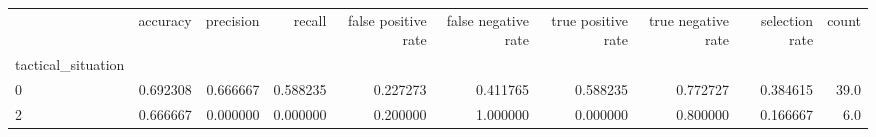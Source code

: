 \begin{tabular}{lrrrrrrrrr}
\toprule
{} &  accuracy &  precision &    recall &  false positive rate &  false negative rate &  true positive rate &  true negative rate &  selection rate &  count \\
tactical\_situation &           &            &           &                      &                      &                     &                     &                 &        \\
\midrule
0                  &  0.692308 &   0.666667 &  0.588235 &             0.227273 &             0.411765 &            0.588235 &            0.772727 &        0.384615 &   39.0 \\
2                  &  0.666667 &   0.000000 &  0.000000 &             0.200000 &             1.000000 &            0.000000 &            0.800000 &        0.166667 &    6.0 \\
\bottomrule
\end{tabular}

